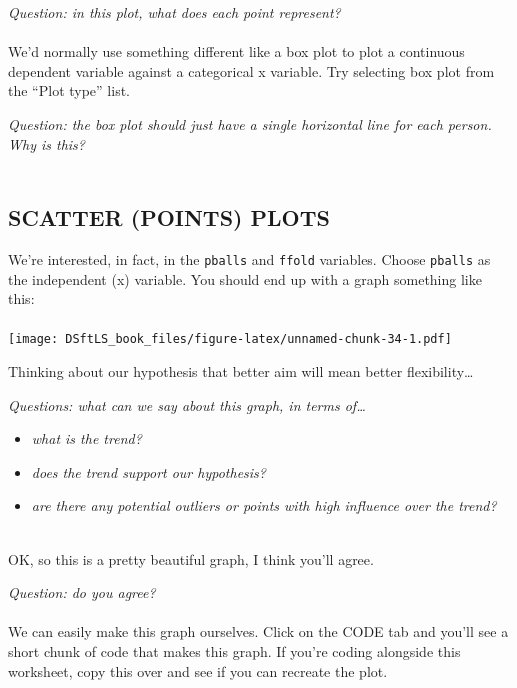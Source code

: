 \documentclass[
]{book}
\providecommand{\tightlist}{%
  \setlength{\itemsep}{0pt}\setlength{\parskip}{0pt}}
\begin{document}
\emph{Question: in this plot, what does each point represent?}\\
~\\

We'd normally use something different like a box plot to plot a continuous
dependent variable against a categorical x variable. Try selecting box plot from
the ``Plot type'' list.

\emph{Question: the box plot should just have a single horizontal line for each
person. Why is this?}\\
~\\

\hypertarget{scatter-points-plots}{%
\subsection{SCATTER (POINTS) PLOTS}\label{scatter-points-plots}}

We're interested, in fact, in the \texttt{pballs} and \texttt{ffold} variables. Choose
\texttt{pballs} as the independent (x) variable. You should end up with a graph something
like this:\\
~\\

\texttt{[image: DSftLS\_book\_files/figure-latex/unnamed-chunk-34-1.pdf]}

Thinking about our hypothesis that
better aim will mean better flexibility\ldots{}

\emph{Questions: what can we say about this graph, in terms of\ldots{}}

\begin{itemize}
\tightlist
\item
  \emph{what is the trend?}
\item
  \emph{does the trend support our hypothesis?}
\item
  \emph{are there any potential outliers or points with high influence over the trend?}\\
  ~\\
\end{itemize}

OK, so this is a pretty beautiful graph, I think you'll agree.

\emph{Question: do you agree?}\\
~\\

We can easily make this graph ourselves. Click on the CODE tab and you'll see a
short chunk of code that makes this graph. If you're coding alongside this worksheet,
copy this over and see if you can recreate the plot.
\end{document}

